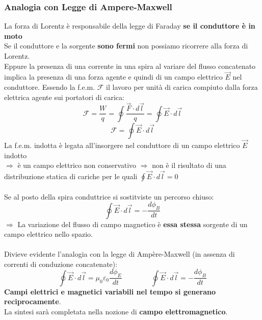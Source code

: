 \documentclass[../main.tex]{subfiles}
\begin{document}
	\subsubsection{Analogia con Legge di Ampere-Maxwell}
	La forza di Lorentz è responsabile della legge di Faraday \textbf{se il conduttore è in moto}\\
	Se il conduttore e la sorgente \textbf{sono fermi} non possiamo ricorrere alla forza di Lorentz.\\
	Eppure la presenza di una corrente in una spira al variare del flusso concatenato implica la presenza di una forza agente e quindi di un campo elettrico $\vec{E}$ nel conduttore.
	Essendo la f.e.m. $\mathscr{F}$ il lavoro per unità di carica compiuto dalla forza elettrica agente sui portatori di carica:
	$$\mathscr{F} = \frac{W}{q} = \oint \frac{\vec{F} \cdot d\vec{l}}{q} = \oint \vec{E} \cdot d\vec{l}$$
	$$\mathscr{F} = \oint \vec{E} \cdot d\vec{l}$$
	La f.e.m. indotta è legata all’insorgere nel conduttore di un campo elettrico $\vec{E}$ indotto\\
	$\Rightarrow$ è un campo elettrico non conservativo $\Rightarrow$ non è il risultato di una distribuzione statica di cariche per le quali $\oint \vec{E} \cdot d\vec{l} = 0$\\\\
	Se al posto della spira conduttrice si sostitviste un percorso chiuso:
	$$\boxed{\oint \vec{E} \cdot d\vec{l} = - \frac{d\phi_B}{dt}}$$
	$\Rightarrow$ La variazione del flusso di campo magnetico è \textbf{essa stessa} sorgente di un campo elettrico nello spazio.\\\\
	Divieve evidente l’analogia con la legge di Ampère-Maxwell (in assenza di correnti di conduzione concatenate):
	$$\oint \vec{E} \cdot d\vec{l} = \mu_0 \varepsilon_0 \frac{d\phi_E}{dt} \qquad \qquad \oint \vec{E} \cdot d\vec{l} = - \frac{d\phi_B}{dt}$$
	\textbf{Campi elettrici e magnetici variabili nel tempo si generano reciprocamente}.\\
	La sintesi sarà completata nella nozione di \textbf{campo elettromagnetico}.
\end{document}
